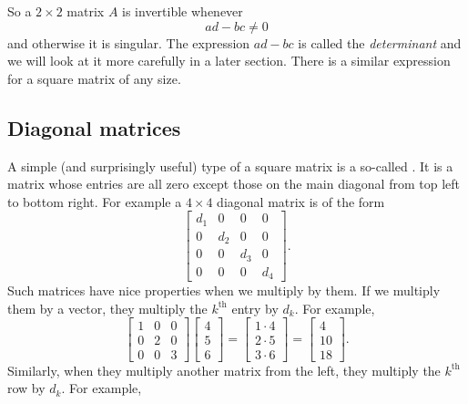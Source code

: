 So a $2 \times 2$ matrix $A$ is invertible whenever
\begin{equation*}
ad - bc \neq 0
\end{equation*}
and otherwise it is singular.  The expression $ad-bc$ is called
the \emph{determinant} and we will look at it
more carefully in a later section.
There is a similar expression for a square
matrix of any size.

\subsection{Diagonal matrices}

A simple (and surprisingly useful) type of a square matrix is a so-called
\emph{}.  It is a matrix whose entries are all zero
except those on the main diagonal from top left to bottom right.  For
example a $4 \times 4$ diagonal matrix is of the form
\begin{equation*}
\begin{bmatrix}
d_1 & 0 & 0 & 0 \\
0 & d_2 & 0 & 0 \\
0 & 0 & d_3 & 0 \\
0 & 0 & 0 & d_4
\end{bmatrix} .
\end{equation*}
Such matrices have nice properties when we multiply by them.  If we multiply
them by a vector, they multiply the $k^{\text{th}}$ entry by $d_k$.  For
example,
\begin{equation*}
\begin{bmatrix}
1 & 0 & 0 \\
0 & 2 & 0 \\
0 & 0 & 3
\end{bmatrix}
\begin{bmatrix}
4 \\ 5 \\ 6
\end{bmatrix}
=
\begin{bmatrix}
1 \cdot 4 \\ 2 \cdot 5 \\ 3 \cdot 6
\end{bmatrix}
=
\begin{bmatrix}
4 \\ 10 \\ 18
\end{bmatrix} .
\end{equation*}
Similarly, when they multiply another matrix from the left, they multiply
the $k^{\text{th}}$ row by $d_k$.  For example,
